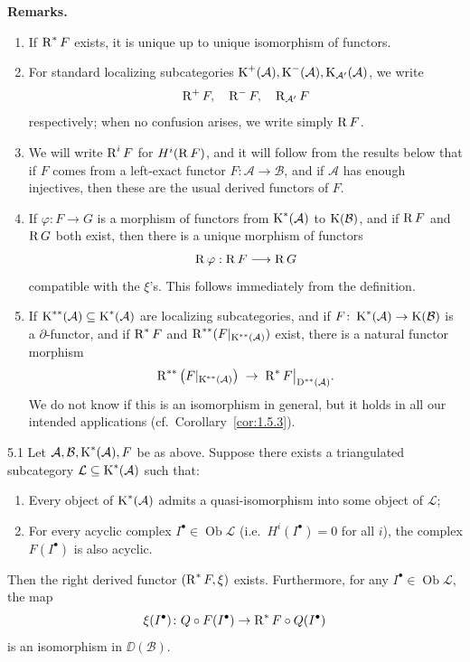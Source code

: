 \textbf{Remarks.}
\begin{enumerate}
\item If $\operatorname{R}^*F$ exists, it is unique up to unique isomorphism of functors.
\item For standard localizing subcategories $\operatorname{K}^+(\mathcal{A}),\operatorname{K}^-(\mathcal{A}),\operatorname{K}_{\mathcal{A}'}(\mathcal{A})$, we write
\[
\operatorname{R}^+F,\quad \operatorname{R}^-F,\quad \operatorname{R}_{\mathcal{A}'}F
\]
respectively; when no confusion arises, we write simply $\operatorname{R} F$.

\item We will write \(\operatorname{R}^i F\) for \(H^i(\operatorname{R} F)\), and it will follow from the results below that if \(F\) comes from a left-exact functor \(F\colon\mathcal{A}\longrightarrow\mathcal{B}\), and if \(\mathcal{A}\) has enough injectives, then these are the usual derived functors of \(F\).

\item If \(\varphi: F \longrightarrow G\) is a morphism of functors from \(\operatorname{K}^*(\mathcal{A})\) to \(\operatorname{K}(\mathcal{B})\), and if \(\operatorname{R} F\) and \(\operatorname{R} G\) both exist, then there is a unique morphism of functors
\[
\operatorname{R} \varphi: \operatorname{R} F \longrightarrow \operatorname{R} G
\]
compatible with the \(\xi\)'s. This follows immediately from the definition.
\item If $\operatorname{K}^{**}(\mathcal{A})\subseteq\operatorname{K}^*(\mathcal{A})$ are localizing subcategories, and if $F\colon\operatorname{K}^*(\mathcal{A})\to\operatorname{K}(\mathcal{B})$ is a $\partial$-functor, and if $\operatorname{R}^*F$ and $\operatorname{R}^{**}(F|_{\operatorname{K}^{**}(\mathcal{A})})$ exist, there is a natural functor morphism
\[
\operatorname{R}^{**}\big(F|_{\operatorname{K}^{**}(\mathcal{A})}\big)
\;\to\;
\operatorname{R}^*F\big|_{\operatorname{D}^{**}(\mathcal{A})}.
\]
We do not know if this is an isomorphism in general, but it holds in all our intended applications (cf.\ Corollary~\ref{cor:1.5.3}).
\end{enumerate}

\begin{booktheorem}{5.1}\label{thm:1.5.1}
Let $\mathcal{A},\mathcal{B},\operatorname{K}^*(\mathcal{A}),F$ be as above. Suppose there exists a triangulated subcategory $\mathcal{L}\subseteq\operatorname{K}^*(\mathcal{A})$ such that:
\begin{enumerate}
\item[(1)] Every object of $\operatorname{K}^*(\mathcal{A})$ admits a quasi-isomorphism into some object of $\mathcal{L}$;
\item[(2)] For every acyclic complex $I^\bullet\in\operatorname{Ob}\mathcal{L}$ (i.e.\ $H^i(I^\bullet)=0$ for all $i$), the complex $F(I^\bullet)$ is also acyclic.
\end{enumerate}
Then the right derived functor $(\operatorname{R}^*F,\xi)$ exists. Furthermore, for any $I^\bullet\in\operatorname{Ob}\mathcal{L}$, the map
\[
\xi(I^\bullet)\colon Q\circ F(I^\bullet) \to \operatorname{R}^*F\circ Q(I^\bullet)
\]
is an isomorphism in $\DD(\mathcal{B})$.
\end{booktheorem}


